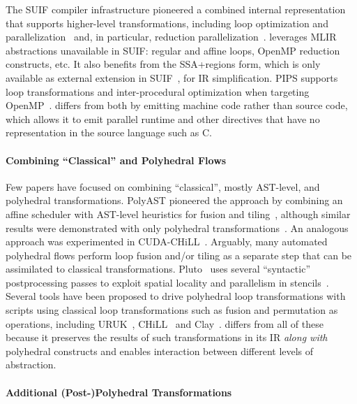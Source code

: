 The SUIF compiler infrastructure pioneered a combined internal representation that supports higher-level transformations, including loop optimization and parallelization~\cite{wilson1994suif} and, in particular, reduction parallelization~\cite{hall1996maximizing}. \tool leverages MLIR abstractions unavailable in SUIF: regular and affine  loops, OpenMP reduction constructs, etc. It also benefits from the SSA+regions form, which is only available as external extension in SUIF~\cite{holloway2002machine}, for IR simplification. PIPS supports loop transformations and inter-procedural optimization when targeting OpenMP~\cite{amini2011pips,amini2012par4all}. \tool differs from both by emitting machine code rather than source code, which allows it to emit parallel runtime and other directives that have no representation in the source language such as C.

\paragraph{Combining ``Classical'' and Polyhedral Flows}

Few papers have focused on combining ``classical'', mostly AST-level, and polyhedral transformations. PolyAST pioneered the approach by combining an affine scheduler with AST-level heuristics for fusion and tiling~\cite{polyast}, although similar results were demonstrated with only polyhedral transformations~\cite{spatial_scheduler}. An analogous approach was experimented in CUDA-CHiLL~\cite{zhang2016combining}. Arguably, many automated polyhedral flows perform loop fusion and/or tiling as a separate step that can be assimilated to classical transformations. Pluto~\cite{Bondhugula2008Pluto} uses several ``syntactic'' postprocessing passes to exploit spatial locality and parallelism in stencils~\cite{spatial_report}. Several tools have been proposed to drive polyhedral loop transformations with scripts using classical loop transformations such as fusion and permutation as operations, including URUK~\cite{uruk}, CHiLL~\cite{chill} and Clay~\cite{clay}. \tool differs from all of these because it preserves the results of such transformations in its IR \emph{along with} polyhedral constructs and enables interaction between different levels of abstraction.

\paragraph{Additional (Post-)Polyhedral Transformations}

